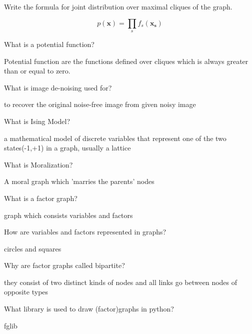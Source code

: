 \documentclass[addpoints]{exam}
\begin{document}
\begin{questions}
\question[0]
Write the formula for joint distribution over maximal cliques of the graph.
\begin{solutionordottedlines}[1in]
$$ p(\mathbf{x}) = \prod_s f_s(\mathbf{x_s}) $$
\end{solutionordottedlines}

\question[0]
What is a potential function? 
\begin{solutionordottedlines}[1in]
Potential function are the functions defined over cliques which is always greater than or equal to zero.
\end{solutionordottedlines}

\question[0]
What is image de-noising used for?
\begin{solutionordottedlines}[1in]
to recover the original noise-free image from given noisy image
\end{solutionordottedlines}

\question[0]
What is Ising Model?
\begin{solutionordottedlines}[1in]
a mathematical model of discrete variables that represent one of the two states(-1,+1) in a graph, usually a lattice 
\end{solutionordottedlines}

\question[0]
What is Moralization?
\begin{solutionordottedlines}[1in]
A moral graph which 'marries the parents' nodes
\end{solutionordottedlines}

\question[0]
What is a factor graph?
\begin{solutionordottedlines}[1in]
graph which consists variables and factors
\end{solutionordottedlines}

\question[0]
How are variables and factors represented in graphs?
\begin{solutionordottedlines}[1in]
circles and squares
\end{solutionordottedlines}

\question[0]
Why are factor graphs called bipartite?
\begin{solutionordottedlines}[1in]
they consist of two distinct kinds of nodes and all links go between nodes of opposite types
\end{solutionordottedlines}

\question[0]
What library is used to draw (factor)graphs in python?
\begin{solutionordottedlines}[1in]
fglib
\end{solutionordottedlines}


\end{questions}
\end{document}
